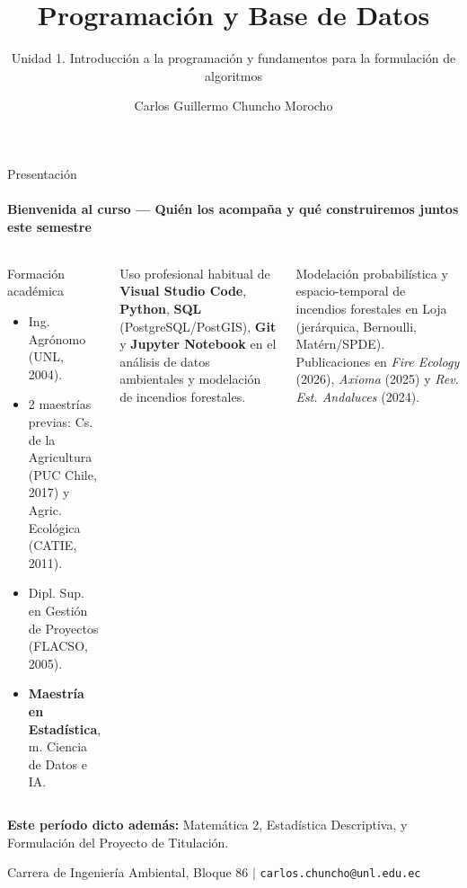 \documentclass[aspectratio=169,11pt]{beamer}
\title[Unidad 1 -- Programación y BD]{Programación y Base de Datos}
\subtitle{Unidad 1. Introducción a la programación y fundamentos para la formulación de algoritmos}
\author[Chuncho Morocho, C. G.]{Carlos Guillermo Chuncho Morocho}
\institute[Ingeniería Ambiental]{Carrera de Ingeniería Ambiental \\ Universidad Nacional de Loja}
\date{}
\begin{document}

\begin{frame}
  \titlepage
\end{frame}

\begin{frame}{Presentación}
\framesubtitle{Bienvenida al curso — Quién los acompaña y qué construiremos juntos este semestre}

\scriptsize
\begin{columns}[T,onlytextwidth]

\begin{block}{Formación académica}
\begin{itemize}[itemsep=0.5pt,topsep=1pt]
  \item Ing. Agrónomo (UNL, 2004).
  \item 2 maestrías previas: Cs. de la Agricultura (PUC Chile, 2017) y Agric. Ecológica (CATIE, 2011).
  \item Dipl. Sup. en Gestión de Proyectos (FLACSO, 2005).
  \item \textbf{Maestría en Estadística}, m. Ciencia de Datos e IA.
\end{itemize}
\end{block}

\begin{envbox}[title=Herramientas de trabajo]
Uso profesional habitual de \textbf{Visual Studio Code}, \textbf{Python}, \textbf{SQL} (PostgreSQL/PostGIS), \textbf{Git} y \textbf{Jupyter Notebook} en el análisis de datos ambientales y modelación de incendios forestales.
\end{envbox}

\begin{techbox}[title=Investigación actual]
Modelación probabilística y espacio-temporal de incendios forestales en Loja
(jerárquica, Bernoulli, Matérn/SPDE). Publicaciones en \textit{Fire Ecology}
(2026), \textit{Axioma} (2025) y \textit{Rev. Est. Andaluces} (2024).
\end{techbox}

\end{columns}

\vspace{0.04cm}

\begin{keybox}[top=2pt,bottom=2pt]
\textbf{Este período dicto además:} Matemática 2, Estadística Descriptiva,
y Formulación del Proyecto de Titulación.
\end{keybox}

\vspace{0.03cm}

\centering
\scriptsize
Carrera de Ingeniería Ambiental, Bloque 86
\quad$\vert$\quad
\texttt{carlos.chuncho@unl.edu.ec}

\end{frame}
\end{document}
